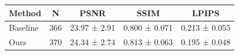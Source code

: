 \begin{tabular}{lcccc}
\toprule
Method & N & PSNR & SSIM & LPIPS \\
\midrule
Baseline & 366 & 23.97 ± 2.91 & 0.800 ± 0.071 & 0.213 ± 0.055 \\
Ours & 370 & 24.34 ± 2.74 & 0.813 ± 0.063 & 0.195 ± 0.048 \\
\bottomrule
\end{tabular}
